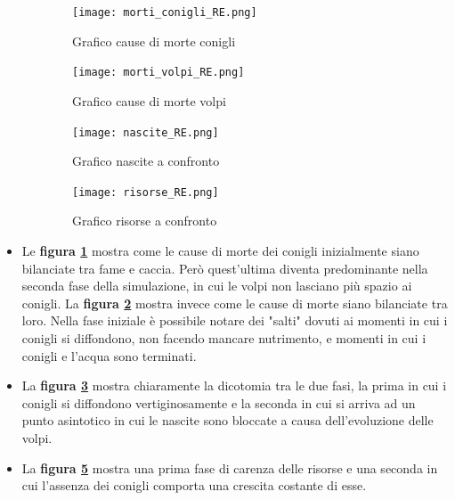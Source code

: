 \documentclass[11pt]{article}
\begin{document}
\begin{figure}[h!]
	\hspace{-5mm}
	\begin{subfigure}{.5\textwidth}
         \centering
         \texttt{[image: morti\_conigli\_RE.png]}
         \caption{Grafico cause di morte conigli}
         \label{fig:morteConigliRE}
	\end{subfigure}
	\begin{subfigure}{.5\textwidth}
		\hspace{7mm}
		\centering
        \texttt{[image: morti\_volpi\_RE.png]}
        \caption{Grafico cause di morte volpi}
        \label{fig:morteVolpiRE}
	\end{subfigure}

	\hspace{-5mm}
	\begin{subfigure}{.5\textwidth}
         \centering
         \texttt{[image: nascite\_RE.png]}
         \caption{Grafico nascite a confronto}
         \label{fig:nasciteRE}
	\end{subfigure}
	\begin{subfigure}{.5\textwidth}
		\hspace{7mm}
		\centering
        \texttt{[image: risorse\_RE.png]}
        \caption{Grafico risorse a confronto}
        \label{fig:risorseRE}
	\end{subfigure}
	 \caption{}
\end{figure}


\begin{itemize}


    \item Le \textbf{figura \ref{fig:morteConigliRE}} mostra come le cause di morte dei conigli inizialmente siano bilanciate tra fame e caccia. Però quest'ultima diventa predominante nella seconda fase della simulazione, in cui le volpi non lasciano più spazio ai conigli. La \textbf{figura \ref{fig:morteVolpiRE}} mostra invece come le cause di morte siano bilanciate tra loro. Nella fase iniziale è possibile notare dei "salti" dovuti ai momenti in cui i conigli si diffondono, non facendo mancare nutrimento, e momenti in cui i conigli e l'acqua sono terminati.


    \item La \textbf{figura \ref{fig:nasciteRE}} mostra chiaramente la dicotomia tra le due fasi, la prima in cui i conigli si diffondono vertiginosamente e la seconda in cui si arriva ad un punto asintotico in cui le nascite sono bloccate a causa dell'evoluzione delle volpi.


    \item La \textbf{figura \ref{fig:risorseRE}} mostra una prima fase di carenza delle risorse e una seconda in cui l'assenza dei conigli comporta una crescita costante di esse.

\end{itemize}
\end{document}
